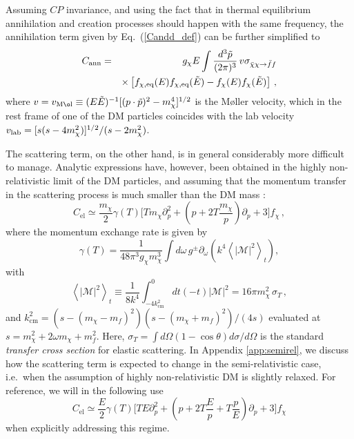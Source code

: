 \documentclass[twocolumn,showpacs,amsmath,amssymb,superscriptaddress,nofootinbib]{revtex4-1}
\newcommand{\be}{\begin{equation}}
\newcommand{\ee}{\end{equation}}
\newcommand{\bea}{\begin{eqnarray}}
\newcommand{\eea}{\end{eqnarray}}
\begin{document}
Assuming $CP$ invariance, and using the fact that in thermal equilibrium annihilation and creation
processes should happen with the same frequency, the annihilation term given by Eq.~(\ref{Candd_def}) 
can be further simplified to \cite{Gondolo:1990dk}
\bea
  \label{Cann_simp}
  C_\mathrm{ann}&=& g_{\chi} E\int\frac{d^3\tilde p}{(2\pi)^3} \,v \sigma_{\bar\chi\chi\rightarrow \bar f f}\nonumber\\
  &&\times\left[
f_{\chi,{\rm eq}}(E)f_{\chi, {\rm eq}}(\tilde E)-f_\chi(E)f_\chi(\tilde E)
\right]\,, 
\eea
where $v=v_{\rm M\o l}\equiv ({E \tilde E})^{-1}[{(p \cdot \tilde p)^2-m_\chi^4}]^{1/2}$ is the M\o ller velocity,
which in the rest frame of one of the DM particles coincides with the lab velocity $v_{\rm lab}=[s(s-4m_\chi^2)]^{1/2}/{(s-2m_\chi^2)}$.

The scattering term, on the other hand, is in general considerably more difficult to manage. Analytic expressions have,
however,  been
obtained in the highly non-relativistic limit of the DM particles, and assuming that the momentum transfer in
 the scattering process is much smaller than the DM mass \cite{Bringmann:2006mu, Bringmann:2009vf, Kasahara:2009th, Gondolo:2012vh, Binder:2016pnr, Bringmann:2016ilk}:
 \be
 \label{Cresult}
C_\mathrm{el}\simeq 
\frac{m_{\chi}}{2} \gamma(T)
{\Bigg [}
T m_{\chi} \partial_p^2 + \left( p + 2 T  \frac{m_{\chi}}{p} \right) \partial_p + 3
{\Bigg ]}f_{\chi}\,,
\ee
where the momentum exchange rate is given by
\be
  \label{cTdef}
  \gamma(T) =  \frac{1}{48 \pi^3g_\chi m_\chi^3} \int d\omega\,g^\pm
  \partial_\omega\left( k^4 
  \left<\left|\mathcal{M}\right|^2\right>_t\right),
\ee
with
\be  
\left\langle\left|\mathcal{M}\right|^2\right\rangle_t 
\equiv \frac{1}{8k^4}\int_{-4{k}_\mathrm{cm}^2}^0
\!\!\!\! dt(-t)\left|\mathcal{M}\right|^2
= 16 \pi m_\chi^2\,\sigma_T\,,
\label{eq:sigmaT}
\ee
and ${k}_\mathrm{cm}^2  \!=\! \left(s-(m_\chi-m_f)^2\right) \left(s-(m_\chi+m_f)^2\right)/(4 s)$ evaluated at ${s=m_\chi^2+2\omega m_\chi+m_f^2}$. 
Here, $\sigma_T=\int d\Omega (1-\cos\theta)d\sigma/d\Omega$ is the standard {\it transfer cross section} for elastic scattering.
In Appendix \ref{app:semirel}, we discuss how the scattering term is expected to change
in the semi-relativistic case, i.e.~when the assumption of highly non-relativistic DM is slightly
relaxed. For reference, we will in the following use
\be
C_\mathrm{el}\simeq 
\frac{E}{2} \gamma(T)
{\Bigg [}
T E \partial_p^2 + \left( p + 2 T  \frac{E}{p} + T \frac{p}{E} \right) \partial_p + 3
{\Bigg ]}f_{\chi}
\label{Csemirel}
\ee
when explicitly addressing this regime. 
\end{document}
